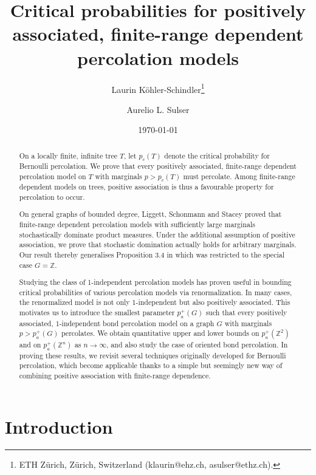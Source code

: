 \documentclass[11pt]{article}
\title{Critical probabilities for positively associated, finite-range dependent percolation models}
\author{Laurin Köhler-Schindler\footnote{ETH Zürich, Zürich, Switzerland (klaurin@ehz.ch, asulser@ethz.ch).}  \and Aurelio L. Sulser\footnotemark[1]}
\date{\today}
\newcommand{\Z}{\mathbb{Z}}
\theoremstyle{remark}
\begin{document}
\maketitle

\begin{abstract}
  	On a locally finite, infinite tree $T$, let $p_c(T)$ denote the critical probability for Bernoulli percolation. 
  	We prove that every positively associated, finite-range dependent percolation model on $T$ with marginals $p > p_c(T)$ must percolate. Among finite-range dependent models on trees, positive association is thus a favourable property for percolation to occur.

    On general graphs of bounded degree, Liggett, Schonmann and Stacey \cite{Liggett1997} proved that finite-range dependent percolation models with sufficiently large marginals stochastically dominate product measures.
    Under the additional assumption of positive association, we prove that stochastic domination actually holds for arbitrary marginals. Our result thereby generalises Proposition 3.4 in \cite{Liggett1997} which was restricted to the special case $G = \Z$.
   
  	Studying the class of 1-independent percolation models has proven useful in bounding critical probabilities of various percolation models via renormalization. In many cases, the renormalized model is not only 1-independent but also positively associated. This motivates us to introduce the smallest parameter $p_a^+(G)$ such that every positively associated, 1-independent bond percolation model on a graph $G$ with marginals $p > p_a^+(G)$ percolates. We obtain quantitative upper and lower bounds on $p_a^+(\Z^2)$ and on $p_a^+(\Z^n)$ as $n\to \infty$, and also study the case of oriented bond percolation. In proving these results, we revisit several techniques originally developed for Bernoulli percolation, which become applicable thanks to a simple but seemingly new way of combining positive association with finite-range dependence. 
\end{abstract}




\section*{Introduction}
\end{document}
